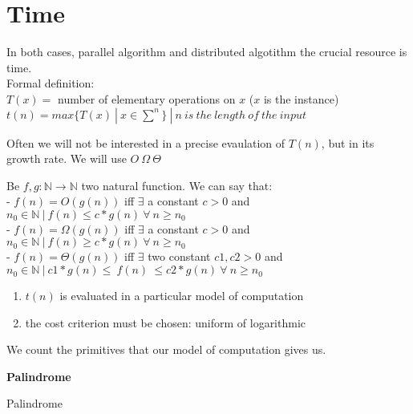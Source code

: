 \section{Time}

In both cases, parallel algorithm and distributed algotithm the crucial resource is time.\\

Formal definition:\\

$T(x) = $ number of elementary operations on $x$ ($x$ is the instance)\\
$t(n) = max\{T(x) \ | \ x \in \sum_{}^{n} \} \ | \  n \ is \ the \ length \ of \ the \ input$

\begin{remark}
Often we will not be interested in a precise evaulation of $T(n)$, but in its growth rate. We will use $O \ \Omega \ \Theta \ $
\end{remark}

\begin{definition}
Be $f,g : \mathbb{N} \rightarrow \mathbb{N}$ two natural function. We can say that:\\
- $f(n) = O(g(n))$ iff $\exists$ a constant $c > 0$ and $n_0 \in \mathbb{N} \ | \ f(n) \leq c*g(n) \ \forall \ n \geq n_0$\\
- $f(n) = \Omega(g(n))$ iff $\exists$ a constant $c > 0$ and $n_0 \in \mathbb{N} \ | \ f(n) \geq c*g(n) \ \forall \ n \geq n_0$\\
- $f(n) = \Theta(g(n))$ iff $\exists$ two constant $c1, c2 > 0$ and $n_0 \in \mathbb{N} \ | \ c1*g(n) \leq \ f(n) \ \leq c2*g(n) \ \forall \ n \geq n_0$\end{definition}

\begin{enumerate}
 \item $t(n)$ is evaluated in a particular model of computation
 \item the cost criterion must be chosen: uniform of logarithmic
\end{enumerate}

We count the primitives that our model of computation gives us.

\textbf{Palindrome}

\begin{algorithm}[H]
 \SetAlgoLined
 \caption{Palindrome}
\end{algorithm}

